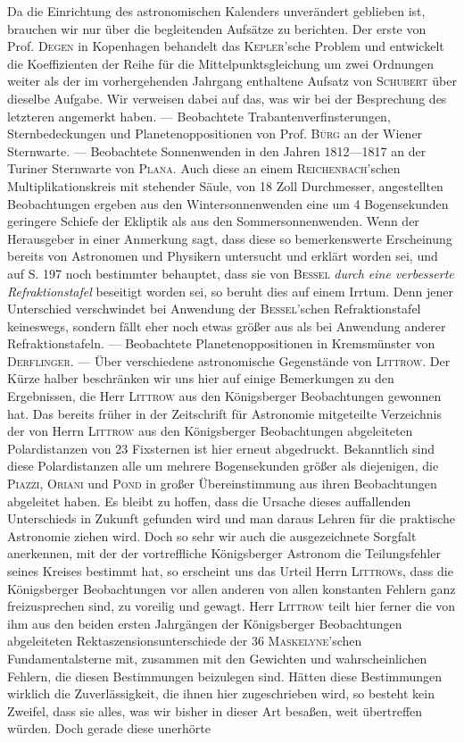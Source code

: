 Da die Einrichtung des astronomischen Kalenders unverändert geblieben ist, brauchen wir nur über die begleitenden Aufsätze zu berichten. Der erste von Prof. \textsc{Degen} in Kopenhagen behandelt das \textsc{Kepler}'sche Problem und entwickelt die Koeffizienten der Reihe für die Mittelpunktsgleichung um zwei Ordnungen weiter als der im vorhergehenden Jahrgang enthaltene Aufsatz von \textsc{Schubert} über dieselbe Aufgabe. Wir verweisen dabei auf das, was wir bei der Besprechung des letzteren angemerkt haben. --- Beobachtete Trabantenverfinsterungen, Sternbedeckungen und Planetenoppositionen von Prof. \textsc{Bürg} an der Wiener Sternwarte. --- Beobachtete Sonnenwenden in den Jahren 1812---1817 an der Turiner Sternwarte von \textsc{Plana}. Auch diese an einem \textsc{Reichenbach}'schen Multiplikationskreis mit stehender Säule, von 18 Zoll Durchmesser, angestellten Beobachtungen ergeben aus den Wintersonnenwenden eine um 4 Bogensekunden geringere Schiefe der Ekliptik als aus den Sommersonnenwenden. Wenn der Herausgeber in einer Anmerkung sagt, dass diese so bemerkenswerte Erscheinung bereits von Astronomen und Physikern untersucht und erklärt worden sei, und auf S. 197 noch bestimmter behauptet, dass sie von \textsc{Bessel} \emph{durch eine verbesserte Refraktionstafel} beseitigt worden sei, so beruht dies auf einem Irrtum. Denn jener Unterschied verschwindet bei Anwendung der \textsc{Bessel}'schen Refraktionstafel keineswegs, sondern fällt eher noch etwas größer aus als bei Anwendung anderer Refraktionstafeln. --- Beobachtete Planetenoppositionen in Kremsmünster von \textsc{Derflinger}. --- Über verschiedene astronomische Gegenstände von \textsc{Littrow}. Der Kürze halber beschränken wir uns hier auf einige Bemerkungen zu den Ergebnissen, die Herr \textsc{Littrow} aus den Königsberger Beobachtungen gewonnen hat. Das bereits früher in der Zeitschrift für Astronomie mitgeteilte Verzeichnis der von Herrn \textsc{Littrow} aus den Königsberger Beobachtungen abgeleiteten Polardistanzen von 23 Fixsternen ist hier erneut abgedruckt. Bekanntlich sind diese Polardistanzen alle um mehrere Bogensekunden größer als diejenigen, die \textsc{Piazzi}, \textsc{Oriani} und \textsc{Pond} in großer Übereinstimmung aus ihren Beobachtungen abgeleitet haben. Es bleibt zu hoffen, dass die Ursache dieses auffallenden Unterschieds in Zukunft gefunden wird und man daraus Lehren für die praktische Astronomie ziehen wird. Doch so sehr wir auch die ausgezeichnete Sorgfalt anerkennen, mit der der vortreffliche Königsberger Astronom die Teilungsfehler seines Kreises bestimmt hat, so erscheint uns das Urteil Herrn \textsc{Littrow}s, dass die Königsberger Beobachtungen vor allen anderen von allen konstanten Fehlern ganz freizusprechen sind, zu voreilig und gewagt. Herr \textsc{Littrow} teilt hier ferner die von ihm aus den beiden ersten Jahrgängen der Königsberger Beobachtungen abgeleiteten Rektaszensionsunterschiede der 36 \textsc{Maskelyne}'schen Fundamentalsterne mit, zusammen mit den Gewichten und wahrscheinlichen Fehlern, die diesen Bestimmungen beizulegen sind. Hätten diese Bestimmungen wirklich die Zuverlässigkeit, die ihnen hier zugeschrieben wird, so besteht kein Zweifel, dass sie alles, was wir bisher in dieser Art besaßen, weit übertreffen würden. Doch gerade diese unerhörte 